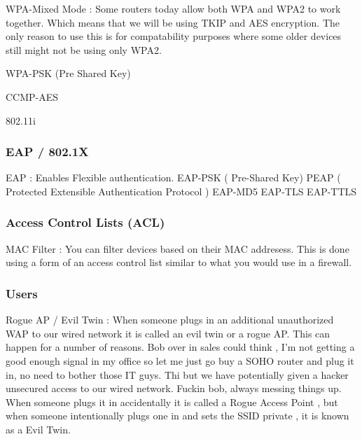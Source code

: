 WPA-Mixed Mode : Some routers today allow both WPA and WPA2 to work together.
Which means that we will be using TKIP and AES encryption. The only reason to
use this is for compatability purposes where some older devices still might not
be using only WPA2.

WPA-PSK (Pre Shared Key)

CCMP-AES

802.11i

\subsubsectionend

\subsubsection{EAP / 802.1X}
\label{sssec:eap}

EAP : Enables Flexible authentication.
EAP-PSK ( Pre-Shared Key)
PEAP ( Protected Extensible Authentication Protocol )
EAP-MD5
EAP-TLS
EAP-TTLS


\subsubsectionend

\subsubsection{Access Control Lists (ACL)}
\label{sssec:access_control_lists_acl_}

MAC Filter : You can filter devices based on their MAC addresess. This is done
using a form of an access control list similar to what you would use in a
firewall.


\subsubsectionend

\subsubsection{Users}
\label{sssec:users}

Rogue AP / Evil Twin : When someone plugs in an additional unauthorized WAP to
our wired network it is called an evil twin or a rogue AP. This can happen for a
number of reasons. Bob over in sales could think , I'm not getting a good enough
signal in my office so let me just go buy a SOHO router and plug it in, no need
to bother those IT guys. Thi but we have potentially given a
hacker unsecured access to our wired network. Fuckin bob, always messing things
up. When someone plugs it in accidentally it is called a Rogue Access Point ,
but when someone intentionally plugs one in and sets the SSID private , it is
known as a Evil Twin.

